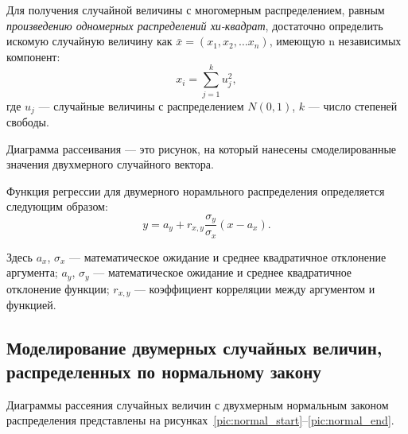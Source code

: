 \newpage

Для получения случайной величины с многомерным распределением, 
равным \textit{произведению одномерных распределений хи-квадрат}, достаточно
определить искомую случайную величину как $ \bar x = (x_1, x_2, \dots x_n) $,
имеющую n независимых компонент:
\begin{equation*}
  x_i = \sum_{j = 1}^{k}{u^{2}_{j}},
\end{equation*}
\noindent где $ u_{j} $ --- случайные величины с распределением $ N(0,1) $,
$ k $ --- число степеней свободы.

Диаграмма рассеивания --- это рисунок, на который нанесены смоделированные значения
двухмерного случайного вектора.

Функция регрессии для двумерного норамльного распределения определяется 
следующим образом:
\begin{equation*}
y = a_y + r_{x,y} \dfrac{\sigma_y}{\sigma_x}(x - a_x).
\end{equation*}

Здесь $ a_x $, $ \sigma_x $ --- математическое ожидание и среднее квадратичное отклонение аргумента;
$ a_y $, $ \sigma_y $ --- математическое ожидание и среднее квадратичное отклонение функции;
$ r_{x,y} $ --- коэффициент корреляции между аргументом и функцией.

\newpage 

\subsection{Моделирование двумерных случайных величин, \\ распределенных по нормальному закону}

Диаграммы рассеяния случайных величин с двухмерным нормальным законом распределения представлены
на рисунках~\ref{pic:normal_start}--\ref{pic:normal_end}.

